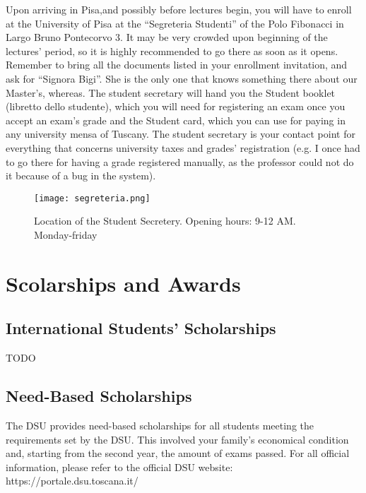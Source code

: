 \documentclass[11pt,fleqn,oneside]{book} %
\begin{document}
Upon arriving in Pisa,and possibly before lectures begin, you will have to enroll at the University of Pisa at the “Segreteria Studenti” of the Polo Fibonacci in Largo Bruno Pontecorvo 3. It may be very crowded upon beginning of the lectures’ period, so it is highly recommended to go there as soon as it opens. Remember to bring all the documents listed in your enrollment invitation, and ask for “Signora Bigi”. She is the only one that knows something there about our Master’s, whereas.
The student secretary will hand you the Student booklet (libretto dello studente), which you will need for registering an exam once you accept an exam’s grade and the Student card, which you can use for paying in any university mensa of Tuscany. The student secretary is your contact point for everything that concerns university taxes and grades’ registration (e.g. I once had to go there for having a grade registered manually, as the professor could not do it because of a bug in the system). 

\begin{figure}[h]
    \centering\texttt{[image: segreteria.png]}
    \caption{Location of the Student Secretery. Opening hours: 9-12 AM. Monday-friday}
\end{figure}



\chapter{Scolarships and Awards}


\section{International Students’ Scholarships}
TODO

\section{Need-Based Scholarships}
The DSU provides need-based scholarships for all students meeting the requirements set by the DSU. This involved your family’s economical condition and, starting from the second year, the amount of exams passed. For all official information, please refer to the official DSU website: https://portale.dsu.toscana.it/
\end{document}
